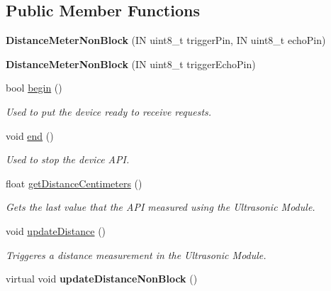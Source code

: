 \subsection*{Public Member Functions}
\begin{DoxyCompactItemize}
\item 
\mbox{\label{class_easyuino_1_1_distance_meter_non_block_ad7e7b63fc4655957eb00f24d82512d2a}} 
{\bfseries Distance\+Meter\+Non\+Block} (IN uint8\+\_\+t trigger\+Pin, IN uint8\+\_\+t echo\+Pin)
\item 
\mbox{\label{class_easyuino_1_1_distance_meter_non_block_af77c0f4649ea521a5b75c457b6762db2}} 
{\bfseries Distance\+Meter\+Non\+Block} (IN uint8\+\_\+t trigger\+Echo\+Pin)
\item 
bool \hyperlink{class_easyuino_1_1_distance_meter_non_block_a46d2093d0fc125e98c3602868c088a77}{begin} ()
\begin{DoxyCompactList}\small\item\em Used to put the device ready to receive requests. \end{DoxyCompactList}\item 
void \hyperlink{class_easyuino_1_1_distance_meter_non_block_a845d4db657ff408205d1cdb3c35982a4}{end} ()
\begin{DoxyCompactList}\small\item\em Used to stop the device A\+PI. \end{DoxyCompactList}\item 
float \hyperlink{class_easyuino_1_1_distance_meter_non_block_a00419fc2c2ff7c587735063971aa7464}{get\+Distance\+Centimeters} ()
\begin{DoxyCompactList}\small\item\em Gets the last value that the A\+PI measured using the Ultrasonic Module. \end{DoxyCompactList}\item 
void \hyperlink{class_easyuino_1_1_distance_meter_non_block_a4ea37c6c0562a76cd03636db329743f9}{update\+Distance} ()
\begin{DoxyCompactList}\small\item\em Triggeres a distance measurement in the Ultrasonic Module. \end{DoxyCompactList}\item 
\mbox{\label{class_easyuino_1_1_distance_meter_non_block_ac7163baab744f1393bab3841de0170d4}} 
virtual void {\bfseries update\+Distance\+Non\+Block} ()
\end{DoxyCompactItemize}

